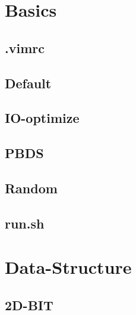 \documentclass[a4paper,10pt,twocolumn,oneside]{article}
\begin{document}
\pagestyle{fancy}
\fancyfoot{}
\fancyhead[R]{\thepage}
\renewcommand{\headrulewidth}{0.4pt}
\renewcommand{\contentsname}{Contents} 

\scriptsize
\tableofcontents


\section{Basics}
\subsection{.vimrc}


\subsection{Default}


\subsection{IO-optimize}


\subsection{PBDS}


\subsection{Random}


\subsection{run.sh}


\section{Data-Structure}
\subsection{2D-BIT}

\end{document}
